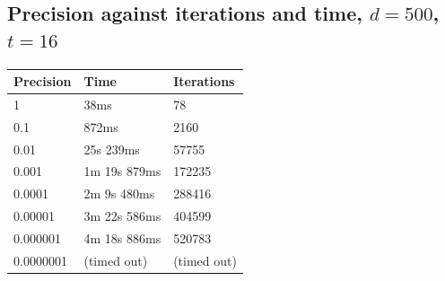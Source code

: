 \documentclass[12pt]{article}
\begin{document}
\begin{appendices}
\subsection{Precision against iterations and time, $d=500$, $t=16$}
\footnotesize{\label{sec:prec}
\begin{center}
\begin{tabular}{|l|l|l|}
\hline
Precision	& Time & Iterations  \\
\hline
1 & 38ms & 78 \\
0.1 & 872ms & 2160 \\
0.01 & 25s 239ms & 57755 \\
0.001 & 1m 19s 879ms & 172235 \\
0.0001 & 2m 9s 480ms & 288416 \\
0.00001 & 3m 22s 586ms & 404599 \\
0.000001 & 4m 18s 886ms & 520783 \\
0.0000001 & (timed out) & (timed out) \\
\hline
\end{tabular}
\end{center}}

	
\end{appendices}
\end{document}
